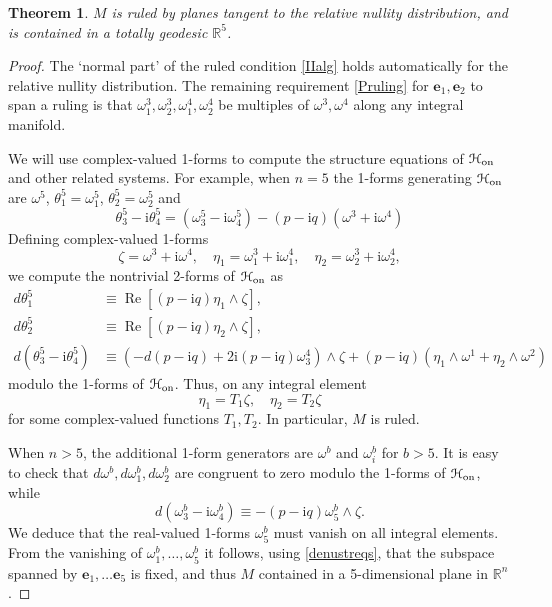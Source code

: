 \documentclass[12pt,reqno]{amsart}
\newtheorem{theorem}{Theorem}
\theoremstyle{definition}
\theoremstyle{remark}
\begin{document}
\begin{theorem} $M$ is ruled by planes tangent to the relative nullity distribution,
and is contained in a totally geodesic ${\mathbb R}^5$.
\end{theorem}
\begin{proof}  The `normal part' of the ruled condition \eqref{IIalg} holds automatically for the relative
nullity distribution.  The remaining requirement \eqref{Pruling} for ${\mathbf e}_1, {\mathbf e}_2$ to span a ruling
is that ${\omega}^3_1, {\omega}^3_2, {\omega}^4_1,{\omega}^4_2$ be multiples of ${\omega}^3, {\omega}^4$ along any integral manifold.

We will use complex-valued 1-forms to compute the structure equations of ${{{\EuScript H}}_{\operatorname{on}}}$ and other related systems.
For example, when $n=5$ the 1-forms generating ${{{\EuScript H}}_{\operatorname{on}}}$ are ${\omega}^5$, $\theta^5_1={\omega}^5_1$,  $\theta^5_2 = {\omega}^5_2$ and
\begin{equation}\label{Honctheta}
\theta^5_3 -{\mathrm i}\theta^5_4 = ({\omega}^5_3 - {\mathrm i} {\omega}^5_4) - (p-{\mathrm i} q) ({\omega}^3+{\mathrm i} {\omega}^4)
\end{equation}
Defining complex-valued 1-forms
$$\zeta = {\omega}^3+ {\mathrm i} {\omega}^4, \quad \eta_1 = {\omega}^3_1 +{\mathrm i} {\omega}^4_1, \quad \eta_2 = {\omega}^3_2 +{\mathrm i} {\omega}^4_2,$$
we compute the nontrivial 2-forms of ${{{\EuScript H}}_{\operatorname{on}}}$  as
\begin{equation}\label{Hon2forms}
\begin{aligned}
d\theta^5_1 &\equiv {\operatorname{Re}}[ (p-{\mathrm i} q)\eta_1{\wedge} \zeta ],\\
d\theta^5_2 &\equiv {\operatorname{Re}}[ (p-{\mathrm i} q)\eta_2{\wedge} \zeta ],\\
d(\theta^5_3 -{\mathrm i} \theta^5_4) &\equiv (-d(p-{\mathrm i} q) + 2{\mathrm i} (p-{\mathrm i} q) {\omega}^4_3) {\wedge} \zeta + (p-{\mathrm i} q)(\eta_1 {\wedge} {\omega}^1 + \eta_2 {\wedge} {\omega}^2)
\end{aligned}
\end{equation}
modulo the 1-forms of ${{{\EuScript H}}_{\operatorname{on}}}$.
Thus, on any integral element
\begin{equation}\label{hyperelts}
\eta_1 = T_1 \zeta, \quad \eta_2 = T_2 \zeta
\end{equation}
for some complex-valued functions $T_1, T_2$.  In particular, $M$ is ruled.

When $n>5$, the additional 1-form generators are ${\omega}^b$ and ${\omega}^b_i$ for $b>5$.
It is easy to check that $d{\omega}^b, d{\omega}^b_1, d{\omega}^b_2$ are congruent to zero modulo the 1-forms of ${{{\EuScript H}}_{\operatorname{on}}}$,
while
$$d({\omega}^b_3-{\mathrm i}{\omega}^b_4) \equiv -(p-{\mathrm i} q){\omega}^b_5 {\wedge} \zeta.$$
We deduce that the real-valued 1-forms ${\omega}^b_5$ must vanish on all integral elements.
From the vanishing of ${\omega}^b_1, \ldots, {\omega}^b_5$ it follows, using \eqref{denustreqs},
that the subspace spanned by ${\mathbf e}_1, \ldots {\mathbf e}_5$ is fixed, and thus $M$ contained
in a 5-dimensional plane in ${\mathbb R}^n$.
\end{proof}
\end{document}
